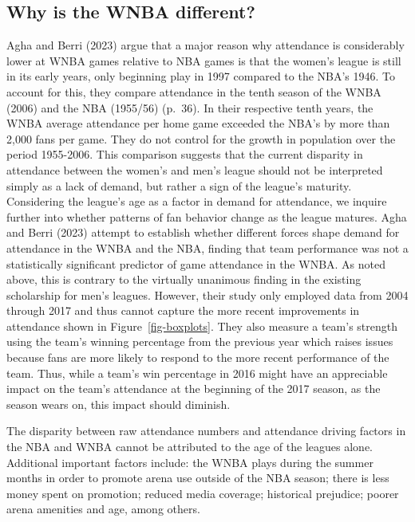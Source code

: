 \documentclass[
  letterpaper,
  DIV=11,
  numbers=noendperiod]{scrartcl}
\begin{document}
\subsection{Why is the WNBA different?}\label{why-is-the-wnba-different}

Agha and Berri (2023) argue that a major reason why attendance is
considerably lower at WNBA games relative to NBA games is that the
women's league is still in its early years, only beginning play in 1997
compared to the NBA's 1946. To account for this, they compare attendance
in the tenth season of the WNBA (2006) and the NBA (1955/56) (p.~36). In
their respective tenth years, the WNBA average attendance per home game
exceeded the NBA's by more than 2,000 fans per game. They do not control
for the growth in population over the period 1955-2006. This comparison
suggests that the current disparity in attendance between the women's
and men's league should not be interpreted simply as a lack of demand,
but rather a sign of the league's maturity. Considering the league's age
as a factor in demand for attendance, we inquire further into whether
patterns of fan behavior change as the league matures. Agha and Berri
(2023) attempt to establish whether different forces shape demand for
attendance in the WNBA and the NBA, finding that team performance was
not a statistically significant predictor of game attendance in the
WNBA. As noted above, this is contrary to the virtually unanimous
finding in the existing scholarship for men's leagues. However, their
study only employed data from 2004 through 2017 and thus cannot capture
the more recent improvements in attendance shown in
Figure~\ref{fig-boxplots}. They also measure a team's strength using the
team's winning percentage from the previous year which raises issues
because fans are more likely to respond to the more recent performance
of the team. Thus, while a team's win percentage in 2016 might have an
appreciable impact on the team's attendance at the beginning of the 2017
season, as the season wears on, this impact should diminish.

The disparity between raw attendance numbers and attendance driving
factors in the NBA and WNBA cannot be attributed to the age of the
leagues alone. Additional important factors include: the WNBA plays
during the summer months in order to promote arena use outside of the
NBA season; there is less money spent on promotion; reduced media
coverage; historical prejudice; poorer arena amenities and age, among
others.
\end{document}
